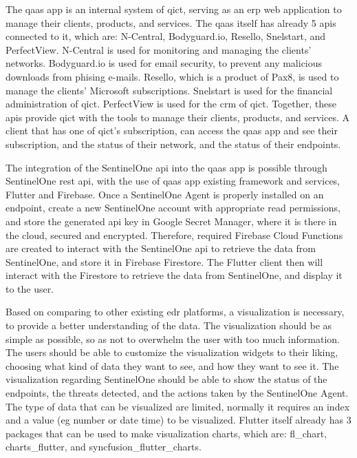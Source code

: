 The \acrshort{qaas} app is an internal system of \acrshort{qict}, serving as an \acrshort{erp} web application to manage
their clients, products, and services. The \acrshort{qaas} itself has already 5 \acrshort{api}s connected to it, which are:
N-Central, Bodyguard.io, Resello, Snelstart, and PerfectView. N-Central is used for monitoring and managing the clients'
networks. Bodyguard.io is used for email security, to prevent any malicious downloads from phising e-mails. Resello,
which is a product of Pax8, is used to manage the clients' Microsoft subscriptions. Snelstart is used for the financial administration
of \acrshort{qict}. PerfectView is used for the \acrshort{crm} of \acrshort{qict}. Together, these \acrshort{api}s provide
\acrshort{qict} with the tools to manage their clients, products, and services. A client that has one of \acrshort{qict}'s subscription,
can access the \acrshort{qaas} app and see their subscription, and the status of their network, and the status of their endpoints.

The integration of the SentinelOne \acrshort{api} into the \acrshort{qaas} app is possible through SentinelOne \acrshort{rest} \acrshort{api},
with the use of \acrshort{qaas} app existing framework and services, Flutter and Firebase. Once a SentinelOne Agent is properly installed on an
endpoint, create a new SentinelOne account with appropriate read permissions, and store the generated \acrshort{api} key in Google Secret Manager,
where it is there in the cloud, secured and encrypted. Therefore, required Firebase Cloud Functions are created to interact with the SentinelOne
\acrshort{api} to retrieve the data from SentinelOne, and store it in Firebase Firestore. The Flutter client then will interact with the
Firestore to retrieve the data from SentinelOne, and display it to the user.

Based on comparing to other existing \acrshort{edr} platforms, a visualization is necessary, to provide a better understanding of the data.
The visualization should be as simple as possible, so as not to overwhelm the user with too much information. The users should be able to
customize the visualization widgets to their liking, choosing what kind of data they want to see, and how they want to see it. The visualization
regarding SentinelOne should be able to show the status of the endpoints, the threats detected, and the actions taken by the SentinelOne Agent.
The type of data that can be visualized are limited, normally it requires an index and a value (\acrshort{eg} number or date time) to be visualized.
Flutter itself already has 3 packages that can be used to make visualization charts, which are: fl\_chart, charts\_flutter, and syncfusion\_flutter\_charts.


